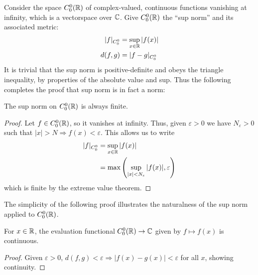       Consider the space $C^0_0(\mathbb{R})$ of complex-valued, continuous functions vanishing at infinity, which is a vectorspace over $\mathbb{C}$.
      Give $C^0_0(\mathbb{R})$ the ``sup norm'' and its associated metric:
      \begin{align*}
        |f|_{C^0_0} &= \sup_{x\in\mathbb{R}}|f(x)|\\
        d(f,g) &= |f-g|_{C^0_0}
      \end{align*}
      It is trivial that the sup norm is positive-definite and obeys the triangle inequality, by properties of the absolute value and sup.
      Thus the following completes the proof that sup norm is in fact a norm:
      \begin{claim}
        The sup norm on $C^0_0(\mathbb{R})$ is always finite.
        \begin{proof}
          Let $f\in C^0_0(\mathbb{R})$, so it vanishes at infinity.
          Thus, given $\varepsilon>0$ we have $N_\varepsilon>0$ such that $|x|>N\Rightarrow f(x)<\varepsilon$.
          This allows us to write
          \begin{align*}
            |f|_{C^0_0} &= \sup_{x\in\mathbb{R}}|f(x)|\\
            &= \max\left(\sup_{|x|<N_\varepsilon}|f(x)|,\varepsilon\right)
          \end{align*}
          which is finite by the extreme value theorem.
        \end{proof}
      \end{claim}

      The simplicity of the following proof illustrates the naturalness of the sup norm applied to $C^0_0(\mathbb{R})$.
      \begin{claim}
        For $x\in\mathbb{R}$, the evaluation functional $C^0_0(\mathbb{R})\rightarrow\mathbb{C}$ given by $f\mapsto f(x)$ is continuous.
        \begin{proof}
          Given $\varepsilon > 0$, $d(f,g)<\varepsilon \Rightarrow |f(x)-g(x)|<\varepsilon$ for all $x$, showing continuity.
        \end{proof}
      \end{claim}

